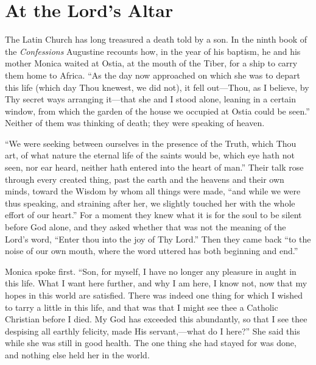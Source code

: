 \section{At the Lord's Altar}

The Latin Church has long treasured a death told by a son. In the ninth book of the \emph{Confessions} Augustine recounts how, in the year of his baptism, he and his mother Monica waited at Ostia, at the mouth of the Tiber, for a ship to carry them home to Africa. ``As the day now approached on which she was to depart this life (which day Thou knewest, we did not), it fell out---Thou, as I believe, by Thy secret ways arranging it---that she and I stood alone, leaning in a certain window, from which the garden of the house we occupied at Ostia could be seen.'' Neither of them was thinking of death; they were speaking of heaven.

``We were seeking between ourselves in the presence of the Truth, which Thou art, of what nature the eternal life of the saints would be, which eye hath not seen, nor ear heard, neither hath entered into the heart of man.'' Their talk rose through every created thing, past the earth and the heavens and their own minds, toward the Wisdom by whom all things were made, ``and while we were thus speaking, and straining after her, we slightly touched her with the whole effort of our heart.'' For a moment they knew what it is for the soul to be silent before God alone, and they asked whether that was not the meaning of the Lord's word, ``Enter thou into the joy of Thy Lord.'' Then they came back ``to the noise of our own mouth, where the word uttered has both beginning and end.''

Monica spoke first. ``Son, for myself, I have no longer any pleasure in aught in this life. What I want here further, and why I am here, I know not, now that my hopes in this world are satisfied. There was indeed one thing for which I wished to tarry a little in this life, and that was that I might see thee a Catholic Christian before I died. My God has exceeded this abundantly, so that I see thee despising all earthly felicity, made His servant,---what do I here?'' She said this while she was still in good health. The one thing she had stayed for was done, and nothing else held her in the world.

